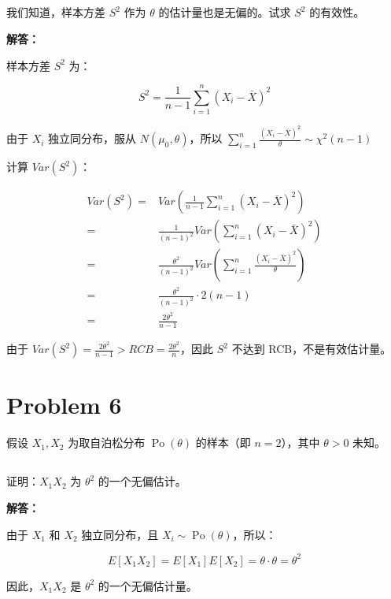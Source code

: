 \documentclass[12pt,a4paper]{article}
\begin{document}
\subsection{}

我们知道，样本方差 $S^2$ 作为 $\theta$ 的估计量也是无偏的。试求 $S^2$ 的有效性。

\begin{answerbox}
\textbf{解答：}

样本方差 $S^2$ 为：

$$
S^2 = \frac{1}{n-1} \sum_{i=1}^n (X_i - \bar{X})^2
$$

由于 $X_i$ 独立同分布，服从 $N(\mu_0, \theta)$，所以 $\sum_{i=1}^n \frac{(X_i-\bar{X})^2}{\theta} \sim \chi^2(n-1)$

计算 $Var(S^2)$：

$$
\begin{aligned}
Var(S^2) =& Var\left(\frac{1}{n-1} \sum_{i=1}^n (X_i - \bar{X})^2\right) \\
=& \frac{1}{(n-1)^2} Var\left(\sum_{i=1}^n (X_i - \bar{X})^2\right) \\
=& \frac{\theta^2}{(n-1)^2} Var\left(\sum_{i=1}^n \frac{(X_i - \bar{X})^2}{\theta}\right) \\
=& \frac{\theta^2}{(n-1)^2} \cdot 2(n-1) \\
=& \frac{2\theta^2}{n-1}
\end{aligned}
$$

由于 $Var(S^2) = \frac{2\theta^2}{n-1} > RCB = \frac{2\theta^2}{n}$，因此 $S^2$ 不达到 RCB，不是有效估计量。

\end{answerbox}

\section{Problem 6}

假设 $X_1,X_2$ 为取自泊松分布 $\operatorname{Po}(\theta)$ 的样本（即 $n=2$），其中 $\theta>0$ 未知。

\subsection{}

证明：$X_1X_2$ 为 $\theta^2$ 的一个无偏估计。

\begin{answerbox}
\textbf{解答：}

由于 $X_1$ 和 $X_2$ 独立同分布，且 $X_i \sim \operatorname{Po}(\theta)$，所以：

$$
E[X_1 X_2] = E[X_1] E[X_2] = \theta \cdot \theta = \theta^2
$$

因此，$X_1 X_2$ 是 $\theta^2$ 的一个无偏估计量。

\end{answerbox}
\end{document}
